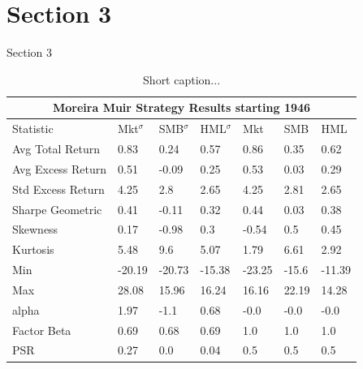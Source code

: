 \documentclass[9pt]{beamer}
\begin{document}
\section{Section 3}
\begin{frame}{Section 3}
    \begin{table}[H]
	\begin{center}
    \begin{tabular}{l l l l l l l}
    \toprule
    \multicolumn{7}{c}{Moreira Muir Strategy Results starting 1946} \\
    \midrule
             Statistic &     Mkt$^{\sigma}$ &     SMB$^{\sigma}$ &    HML$^{\sigma}$ &     Mkt &    SMB &     HML \\
    \midrule
  Avg Total Return &    0.83 &    0.24 &    0.57 &    0.86 &   0.35 &    0.62 \\
 Avg Excess Return &    0.51 &   -0.09 &    0.25 &    0.53 &   0.03 &    0.29 \\
 Std Excess Return &    4.25 &     2.8 &    2.65 &    4.25 &   2.81 &    2.65 \\
  Sharpe Geometric &    0.41 &   -0.11 &    0.32 &    0.44 &   0.03 &    0.38 \\
          Skewness &    0.17 &   -0.98 &     0.3 &   -0.54 &    0.5 &    0.45 \\
          Kurtosis &    5.48 &     9.6 &    5.07 &    1.79 &   6.61 &    2.92 \\
               Min &  -20.19 &  -20.73 &  -15.38 &  -23.25 &  -15.6 &  -11.39 \\
               Max &   28.08 &   15.96 &   16.24 &   16.16 &  22.19 &   14.28 \\
             alpha &    1.97 &    -1.1 &    0.68 &    -0.0 &   -0.0 &    -0.0 \\
       Factor Beta &    0.69 &    0.68 &    0.69 &     1.0 &    1.0 &     1.0 \\
               PSR &    0.27 &     0.0 &    0.04 &     0.5 &    0.5 &     0.5 \\
    \bottomrule
    \end{tabular}
	\caption{Short caption...}
    \label{tab:MMresults}
    \end{center}
    \end{table}
\end{frame}
\end{document}
